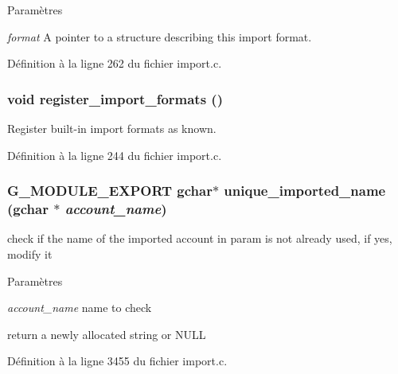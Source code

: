 \begin{DoxyParams}{Paramètres}
\item[{\em format}]A pointer to a structure describing this import format. \end{DoxyParams}


Définition à la ligne 262 du fichier import.c.

\subsubsection[{register\_\-import\_\-formats}]{\setlength{\rightskip}{0pt plus 5cm}void register\_\-import\_\-formats ()}\label{import_8h_a24f0a83e63a5c81379d5971d41256324}
Register built-\/in import formats as known. 

Définition à la ligne 244 du fichier import.c.

\subsubsection[{unique\_\-imported\_\-name}]{\setlength{\rightskip}{0pt plus 5cm}G\_\-MODULE\_\-EXPORT gchar$\ast$ unique\_\-imported\_\-name (gchar $\ast$ {\em account\_\-name})}\label{import_8h_a749d3f56e4864750955ed170111dca08}
check if the name of the imported account in param is not already used, if yes, modify it


\begin{DoxyParams}{Paramètres}
\item[{\em account\_\-name}]name to check\end{DoxyParams}
return a newly allocated string or NULL 

Définition à la ligne 3455 du fichier import.c.

